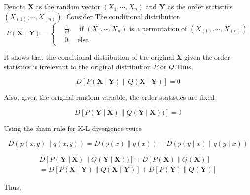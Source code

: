\documentclass[a4paper]{article}
\begin{document}
\begin{enumerate}
\begin{enumerate}
      Denote $\boldsymbol{X}$ as the random vector $(X_1,\cdots,X_n)$ and $\boldsymbol{Y}$ as the order statistics $(X_{(1)},\cdots,X_{(n)})$. Consider The conditional distribution 
      \begin{equation}
        P(\boldsymbol{X}\mid \boldsymbol{Y} ) = \left\{\begin{aligned}
          &\frac{1}{n!},\quad \text{if  }  (X_1,\cdots,X_n)\text{ is a permutation of } (X_{(1)},\cdots,X_{(n)}) \\ &0, \quad \text{else}
        \end{aligned}\right.
      \end{equation}

      It shows that the conditional distribution of the original $\boldsymbol{X}$ given the order statistics is irrelevant to the original distribution $P$ or $Q$.Thus,

      \begin{equation}
        D\left[P(\boldsymbol{X} \mid \boldsymbol{Y} )\| Q(\boldsymbol{X} \mid \boldsymbol{Y} )\right] = 0
      \end{equation}

      Also, given the original random variable, the order statistics are fixed.

      \begin{equation}
        D\left[P(\boldsymbol{Y} \mid \boldsymbol{X} )\| Q(\boldsymbol{Y} \mid \boldsymbol{X} ) )\right] = 0
      \end{equation}


      Using the chain rule for K-L divergence twice

      \begin{equation}
        D(p(x, y) \| q(x, y))=D(p(x) \| q(x))+D(p(y \mid x) \| q(y \mid x))
      \end{equation}

      \begin{equation}
        \begin{aligned}
          D\left[P(\boldsymbol{Y} \mid \boldsymbol{X} )\| Q(\boldsymbol{Y} \mid \boldsymbol{X} ) )\right] + D\left[P(\boldsymbol{X}) \| Q(\boldsymbol{X})\right]  \\ =D\left[P(\boldsymbol{X} \mid \boldsymbol{Y} )\| Q(\boldsymbol{X} \mid \boldsymbol{Y} )\right] + D\left[P(\boldsymbol{Y}) \| Q(\boldsymbol{Y})\right]
        \end{aligned}
      \end{equation}

      Thus,


\end{enumerate}
\end{enumerate}
\end{document}
